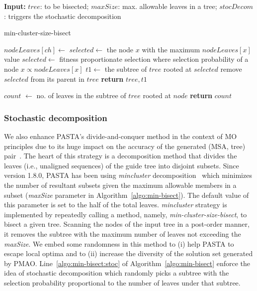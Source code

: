 \begin{algorithm}[!htbp]%
	\scriptsize
	\textbf{Input:} $tree$: to be bisected; $maxSize$: max. allowable leaves in a tree; $stocDecom$: triggers the stochastic decomposition 
	\begin{algorithmic}[1]
		\caption{min-cluster-size-bisect}
		\label{algo:min-bisect}
		\State $nodeLeaves[ch] \gets $ 
		\EndFor 
		\State $selected \gets$ the node $x$ with the maximum $nodeLeaves[x]$ value
		\Else	
		\State $selected \gets $ fitness proportionate selection where selection probability of a node $x \propto nodeLeaves[x]$  \label{algo:min-bisect:stoc}
		\EndIf
		\EndIf
		\State $t1 \gets $ the subtree of $tree$ rooted at $selected$
		\State remove $selected$ from its parent in $tree$
		\EndFor
		\State \textbf{return} $tree, t1$
		\Statex
		
		\State $ count $ $\gets$ no. of leaves in the subtree of $tree$ rooted at $node$
		\State \textbf{return} $ count $
		\EndFunction
	\end{algorithmic}
\end{algorithm}

\subsubsection{Stochastic decomposition}\label{subsec:stocastic}
We also enhance PASTA's divide-and-conquer method in the context of MO principles due to its huge impact on the accuracy of the generated (MSA, tree) pair~\cite{liu2012sate}. The heart of this strategy is a decomposition method that divides the leaves (i.e., unaligned sequences) of the guide tree into disjoint subsets. Since version 1.8.0, PASTA has been using \textit{mincluster} decomposition~\cite{balaban2019treecluster} which minimizes the number of resultant subsets given the maximum allowable members in a subset (\textit{maxSize} parameter in Algorithm~\ref{algo:min-bisect}). The default value of this parameter is set to the half of the total leaves. \textit{mincluster} strategy is implemented by repeatedly calling a method, namely, \textit{min-cluster-size-bisect}, to bisect a given tree. Scanning the nodes of the input tree in a post-order manner, it removes the subtree with the maximum number of leaves not exceeding the \textit{maxSize}. We embed some randomness in this method to (i) help PASTA to escape local optima and to (ii) increase the diversity of the solution set generated by PMAO. Line~\ref{algo:min-bisect:stoc} of Algorithm~\ref{algo:min-bisect} enforce the idea of stochastic decomposition which randomly picks a subtree with the selection probability proportional to the number of leaves under that subtree.

